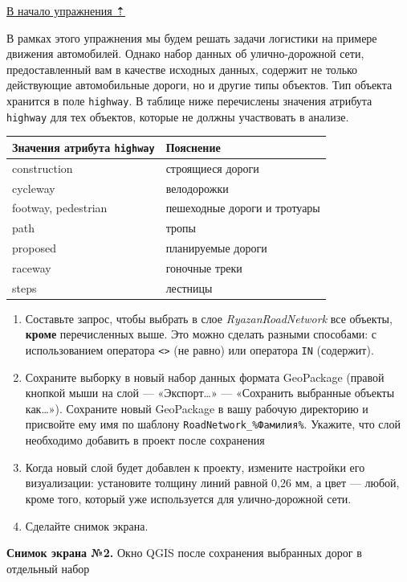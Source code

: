 \documentclass[
  12pt,
]{book}
\begin{document}
\protect\hyperlink{networks}{В начало упражнения ⇡}

В рамках этого упражнения мы будем решать задачи логистики на примере движения автомобилей. Однако набор данных об улично-дорожной сети, предоставленный вам в качестве исходных данных, содержит не только действующие автомобильные дороги, но и другие типы объектов. Тип объекта хранится в поле \texttt{highway}. В таблице ниже перечислены значения атрибута \texttt{highway} для тех объектов, которые не должны участвовать в анализе.

\begin{longtable}[]{@{}ll@{}}
\toprule
Значения атрибута \texttt{highway} & Пояснение \\
\midrule
\endhead
construction & строящиеся дороги \\
cycleway & велодорожки \\
footway, pedestrian & пешеходные дороги и тротуары \\
path & тропы \\
proposed & планируемые дороги \\
raceway & гоночные треки \\
steps & лестницы \\
\bottomrule
\end{longtable}

\begin{enumerate}
\def\labelenumi{\arabic{enumi}.}
\item
  Составьте запрос, чтобы выбрать в слое \emph{RyazanRoadNetwork} все объекты, \textbf{кроме} перечисленных выше. Это можно сделать разными способами: с использованием оператора \texttt{\textless{}\textgreater{}} (не равно) или оператора \texttt{IN} (содержит).
\item
  Сохраните выборку в новый набор данных формата GeoPackage (правой кнопкой мыши на слой --- «Экспорт\ldots» --- «Сохранить выбранные объекты как\ldots»). Сохраните новый GeoPackage в вашу рабочую директорию и присвойте ему имя по шаблону \texttt{RoadNetwork\_\%Фамилия\%}. Укажите, что слой необходимо добавить в проект после сохранения
\item
  Когда новый слой будет добавлен к проекту, измените настройки его визуализации: установите толщину линий равной 0,26 мм, а цвет --- любой, кроме того, который уже используется для улично-дорожной сети.
\item
  Сделайте снимок экрана.
\end{enumerate}

\textbf{Снимок экрана №2.} Окно QGIS после сохранения выбранных дорог в отдельный набор
\end{document}
